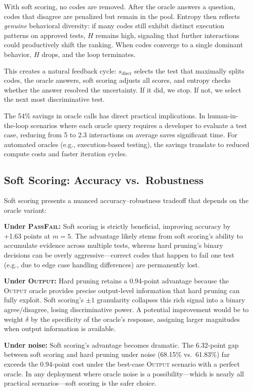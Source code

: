 \documentclass[conference]{IEEEtran}
\begin{document}
With soft scoring, no codes are removed. After the oracle answers a question, codes that disagree are penalized but remain in the pool. Entropy then reflects \emph{genuine} behavioral diversity: if many codes still exhibit distinct execution patterns on approved tests, $H$ remains high, signaling that further interactions could productively shift the ranking. When codes converge to a single dominant behavior, $H$ drops, and the loop terminates.

This creates a natural feedback cycle: $s_{\text{discr}}$ selects the test that maximally splits codes, the oracle answers, soft scoring adjusts all scores, and entropy checks whether the answer resolved the uncertainty. If it did, we stop. If not, we select the next most discriminative test.

The 54\% savings in oracle calls has direct practical implications. In human-in-the-loop scenarios where each oracle query requires a developer to evaluate a test case, reducing from 5 to 2.3 interactions on average saves significant time. For automated oracles (e.g., execution-based testing), the savings translate to reduced compute costs and faster iteration cycles.

\subsection{Soft Scoring: Accuracy vs.\ Robustness}

Soft scoring presents a nuanced accuracy--robustness tradeoff that depends on the oracle variant:

\textbf{Under \textsc{PassFail}:} Soft scoring is strictly beneficial, improving accuracy by +1.63 points at $m=5$. The advantage likely stems from soft scoring's ability to accumulate evidence across multiple tests, whereas hard pruning's binary decisions can be overly aggressive---correct codes that happen to fail one test (e.g., due to edge case handling differences) are permanently lost.

\textbf{Under \textsc{Output}:} Hard pruning retains a 0.94-point advantage because the \textsc{Output} oracle provides precise output-level information that hard pruning can fully exploit. Soft scoring's $\pm 1$ granularity collapses this rich signal into a binary agree/disagree, losing discriminative power. A potential improvement would be to weight $\delta$ by the specificity of the oracle's response, assigning larger magnitudes when output information is available.

\textbf{Under noise:} Soft scoring's advantage becomes dramatic. The 6.32-point gap between soft scoring and hard pruning under noise (68.15\% vs.\ 61.83\%) far exceeds the 0.94-point cost under the best-case \textsc{Output} scenario with a perfect oracle. In any deployment where oracle noise is a possibility---which is nearly all practical scenarios---soft scoring is the safer choice.
\end{document}
